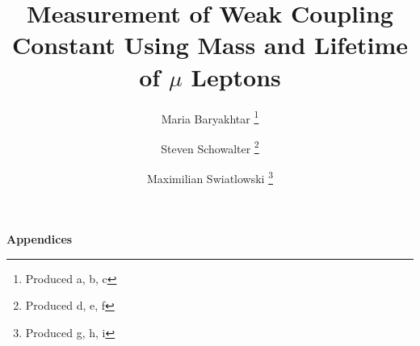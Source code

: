 \documentclass[psfig,12pt,notitlepage]{article}
\begin{document}
\title{Measurement of Weak Coupling Constant Using Mass and Lifetime of $\mu$ Leptons}
\author{Maria Baryakhtar \footnote{Produced a, b, c} \and Steven Schowalter \footnote{Produced d, e, f} \and Maximilian Swiatlowski \footnote{Produced g, h, i}}

\maketitle





\tableofcontents
\setcounter{tocdepth}{2}
\listoffigures


\clearpage












\newpage

\appendix

\begin{center}
\begin{Large}
\bfseries{Appendices}
\end{Large}
\end{center}






\end{document}
